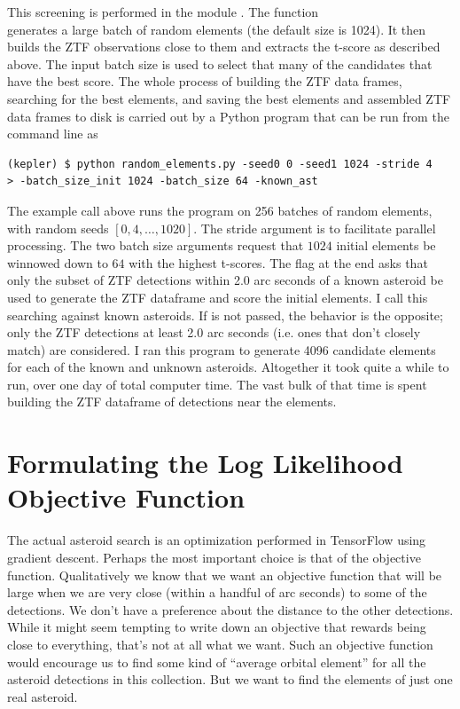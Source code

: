 This screening is performed in the module .
The function \\
 generates a large batch of random elements (the default size is 1024).
It then builds the ZTF observations close to them and extracts the t-score as described above.
The input batch size is used to select that many of the candidates that have the best score.
The whole process of building the ZTF data frames, searching for the best elements,
and saving the best elements and assembled ZTF data frames to disk is carried out by a Python program that can be run from the command line as
\begin{lstlisting}[style=CodeSnippet]
(kepler) $ python random_elements.py -seed0 0 -seed1 1024 -stride 4 
> -batch_size_init 1024 -batch_size 64 -known_ast
\end{lstlisting}
The example call above runs the program on 256 batches of random elements, with random seeds $[0, 4, \ldots, 1020]$.
The stride argument is to facilitate parallel processing.
The two batch size arguments request that $1024$ initial elements be winnowed down to $64$ with the highest t-scores.
The flag  at the end asks that only the subset of ZTF detections within 2.0 arc seconds of a known asteroid be used 
to generate the ZTF dataframe and score the initial elements.
I call this searching against known asteroids.
If  is not passed, the behavior is the opposite; only the ZTF detections at least 2.0 arc seconds (i.e. ones that don't closely match) are considered.
I ran this program to generate 4096 candidate elements for each of the known and unknown asteroids.
Altogether it took quite a while to run, over one day of total computer time.
The vast bulk of that time is spent building the ZTF dataframe of detections near the elements.

\section{Formulating the Log Likelihood Objective Function}
\label{section_log_likelihood}
The actual asteroid search is an optimization performed in TensorFlow using gradient descent.
Perhaps the most important choice is that of the objective function.
Qualitatively we know that we want an objective function that will be large when we are very close 
(within a handful of arc seconds) to some of the detections.
We don't have a preference about the distance to the other detections.
While it might seem tempting to write down an objective that rewards being close to everything, that's not at all what we want.
Such an objective function would encourage us to find some kind of ``average orbital element'' for all the asteroid detections  in this collection.
But we want to find the elements of just one real asteroid.

